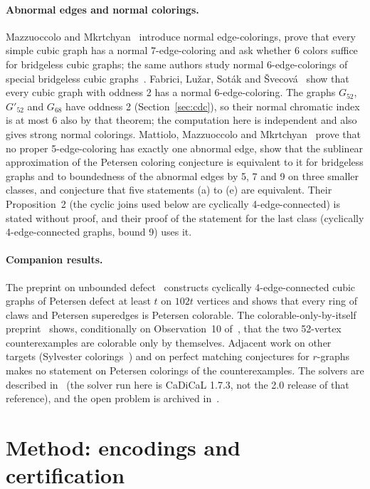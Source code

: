 \documentclass[11pt]{article}
\theoremstyle{definition}
\theoremstyle{remark}
\newcommand{\Gfty}{G_{52}}
\newcommand{\Gftyb}{G'_{52}}
\newcommand{\Gsix}{G_{68}}
\begin{document}
\paragraph{Abnormal edges and normal colorings.} Mazzuoccolo and Mkrtchyan~\cite{MazzMkrt2020}
introduce normal edge-colorings, prove that every simple cubic graph has a normal 7-edge-coloring
and ask whether 6 colors suffice for bridgeless cubic graphs; the same authors study normal
6-edge-colorings of special bridgeless cubic graphs~\cite{MM2020b}. Fabrici, Lu\v{z}ar, Sot\'ak
and \v{S}vecov\'a~\cite{FLSS2025} show that every cubic graph with oddness 2 has a normal
6-edge-coloring. The graphs $\Gfty$, $\Gftyb$ and $\Gsix$ have oddness 2 (Section~\ref{sec:cdc}),
so their normal chromatic index is at most 6 also by that theorem; the computation here is
independent and also gives strong normal colorings. Mattiolo, Mazzuoccolo and
Mkrtchyan~\cite{MMM2021} prove that no proper 5-edge-coloring has exactly one abnormal edge, show
that the sublinear approximation of the Petersen coloring conjecture is equivalent to it for
bridgeless graphs and to boundedness of the abnormal edges by 5, 7 and 9 on three smaller classes,
and conjecture that five statements (a) to (e) are equivalent. Their Proposition~2 (the cyclic
joins used below are cyclically 4-edge-connected) is stated without proof, and their proof of the
statement for the last class (cyclically 4-edge-connected graphs, bound 9) uses it.

\paragraph{Companion results.} The preprint on unbounded defect~\cite{UD2026} constructs cyclically
4-edge-connected cubic graphs of Petersen defect at least $t$ on $102t$ vertices and shows that
every ring of claws and Petersen superedges is Petersen colorable. The colorable-only-by-itself
preprint~\cite{COBI2026} shows, conditionally on Observation~10 of~\cite{GJMMMU2026}, that the two
52-vertex counterexamples are colorable only by themselves. Adjacent work on other targets
(Sylvester colorings~\cite{FM2026}) and on perfect matching conjectures for $r$-graphs~\cite{MSWZ2026}
makes no statement on Petersen colorings of the counterexamples. The solvers are described
in~\cite{CaDiCaL2024, DRATtrim2014} (the solver run here is CaDiCaL 1.7.3, not the 2.0 release of
that reference), and the open problem is archived in~\cite{OPG}.

\section{Method: encodings and certification}\label{sec:encodings}
\end{document}
